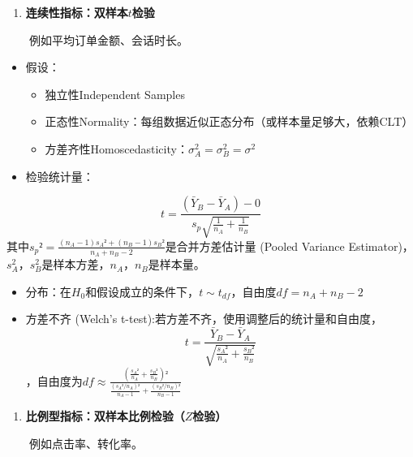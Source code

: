 \documentclass[
  letterpaper,
  DIV=11,
  numbers=noendperiod]{scrreprt}
\providecommand{\tightlist}{%
  \setlength{\itemsep}{0pt}\setlength{\parskip}{0pt}}
\begin{document}
\begin{enumerate}
\def\labelenumi{\arabic{enumi}.}
\setcounter{enumi}{1}
\tightlist
\item
  \textbf{连续性指标：双样本}\(t\)\textbf{检验}
\end{enumerate}

  例如平均订单金额、会话时长。

\begin{itemize}
\item
  假设：

  \begin{itemize}
  \item
    独立性Independent Samples
  \item
    正态性Normality：每组数据近似正态分布（或样本量足够大，依赖CLT）
  \item
    方差齐性Homoscedasticity：\(\sigma_A^2 = \sigma_B^2 = \sigma^2\)
  \end{itemize}
\item
  检验统计量：
\end{itemize}

\[t = \frac{(\bar{Y}_B - \bar{Y}_A) - 0}{s_p \sqrt{\frac{1}{n_A} + \frac{1}{n_B}}}\]
其中\(s_p² = \frac{(n_A - 1)s_A² + (n_B - 1)s_B²}{n_A + n_B - 2}\)是合并方差估计量
(Pooled Variance
Estimator)，\(s_A^2\)，\(s_B^2\)是样本方差，\(n_A\)，\(n_B\)是样本量。

\begin{itemize}
\item
  分布：在\(H_0\)和假设成立的条件下，\(t \sim t_{df}\)，自由度\(df = n_A+n_B-2\)
\item
  方差不齐 (Welch's t-test):若方差不齐，使用调整后的统计量和自由度，
  \[t = \frac{\bar{Y}_B - \bar{Y}_A}{\sqrt{\frac{s_A²}{n_A} + \frac{s_B²}{n_B}}}\]，自由度为\(df ≈ \frac{(\frac{s_A²}{n_A} + \frac{s_B²}{n_B})²}{\frac{(s_A²/n_A)²}{n_A - 1} + \frac{(s_B²/n_B)²}{n_B - 1}}\)
\end{itemize}

\begin{enumerate}
\def\labelenumi{\arabic{enumi}.}
\setcounter{enumi}{2}
\tightlist
\item
  \textbf{比例型指标：双样本比例检验（}\(Z\)\textbf{检验）}
\end{enumerate}

  例如点击率、转化率。
\end{document}
